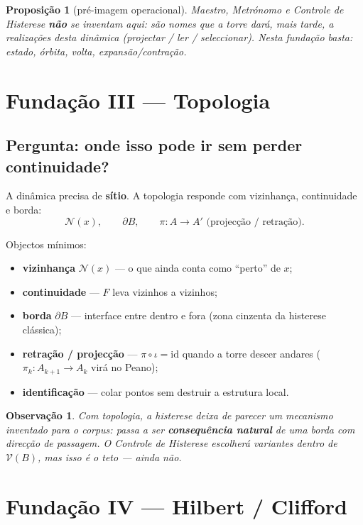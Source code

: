 \documentclass[11pt,a4paper]{article}
\newtheorem{proposicao}{Proposição}
\newtheorem{observacao}{Observação}
\begin{document}
\begin{proposicao}[pré-imagem operacional]
Maestro, Metrónomo e Controle de Histerese \textbf{não} se inventam
aqui: são nomes que a torre dará, mais tarde, a realizações desta
dinâmica (projectar / ler / seleccionar). Nesta fundação basta:
estado, órbita, volta, expansão/contração.
\end{proposicao}

\section{Fundação III --- Topologia}\label{sec:fund-topologia}
\subsection*{Pergunta: onde isso pode ir sem perder continuidade?}

A dinâmica precisa de \textbf{sítio}. A topologia responde com
vizinhança, continuidade e borda:
\[
\boxed{
\mathcal{N}(x),\qquad
\partial B,\qquad
\pi\colon A\to A'
\text{ (projecção / retração)}.
}
\]

\noindent Objectos mínimos:
\begin{itemize}
\item \textbf{vizinhança} $\mathcal{N}(x)$ --- o que ainda conta como
``perto'' de $x$;
\item \textbf{continuidade} --- $F$ leva vizinhos a vizinhos;
\item \textbf{borda} $\partial B$ --- interface entre dentro e fora
(zona cinzenta da histerese clássica);
\item \textbf{retração / projecção} --- $\pi\circ\iota=\mathrm{id}$
quando a torre descer andares ($\pi_k\colon A_{k+1}\to A_k$ virá no
Peano);
\item \textbf{identificação} --- colar pontos sem destruir a estrutura
local.
\end{itemize}

\begin{observacao}
Com topologia, a histerese deixa de parecer um mecanismo inventado para
o corpus: passa a ser \textbf{consequência natural} de uma borda com
direcção de passagem. O Controle de Histerese escolherá variantes
dentro de $\mathcal{V}(B)$, mas isso é o teto --- ainda não.
\end{observacao}

\section{Fundação IV --- Hilbert / Clifford}\label{sec:fund-hilbert}
\end{document}
